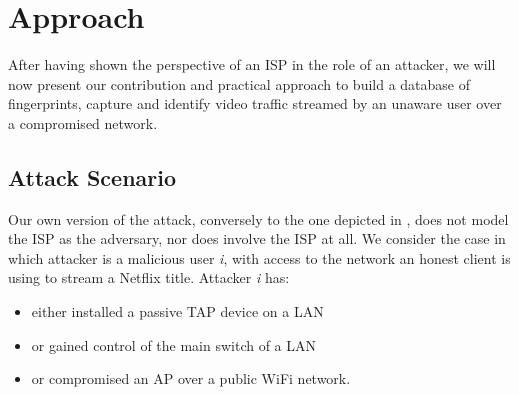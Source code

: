 \chapter{Approach}\label{sec:approach}

After having shown the perspective of an ISP in the role of an attacker, we
will now present our contribution and practical approach to build a database of
fingerprints, capture and identify video traffic streamed by an unaware user
over a compromised network. 

\section{Attack Scenario}

Our own version of the attack, conversely to the one depicted in
, does not model the ISP as the adversary, nor does involve
the ISP at all. We consider the case in which attacker is a malicious user
\emph{i}, with access to the network an honest client is using to stream a
Netflix title. Attacker \emph{i} has:

\begin{itemize}
    \item either installed a passive TAP device on a LAN
    \item or gained control of the main switch of a LAN
    \item or compromised an AP over a public WiFi network.
\end{itemize}



